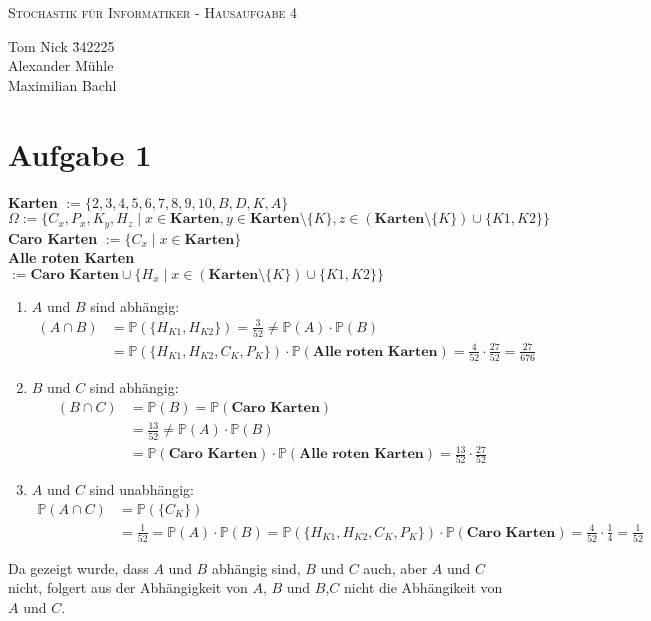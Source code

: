 \documentclass[10pt,a4paper,parskip=half]{scrartcl}
\newcommand{\PP}{\mathbb{P}}
\begin{document}
\begin{center}
\textsc{\Large{Stochastik für Informatiker - Hausaufgabe 4}} \\
\end{center}
\begin{tabbing}
Tom Nick \hspace{1.4cm}\= 342225\\
Alexander Mühle\\
Maximilian Bachl
\end{tabbing}
\section*{Aufgabe 1}
\textbf{Karten} $:= \{2,3,4,5,6,7,8,9,10,B,D,K,A\}$ \\
$\Omega := \{C_x, P_x, K_y, H_z \mid x \in \textbf{Karten}, y \in \textbf{Karten}\setminus\{K\}, z \in (\textbf{Karten}\setminus\{K\})\cup\{K1,K2\}\}$ \\
\textbf{Caro Karten} $:= \{C_x \mid x \in \textbf{Karten}\}$ \\
\textbf{Alle roten Karten} $:= \textbf{Caro Karten}   \cup \{H_x \mid x \in (\textbf{Karten}\setminus\{K\})\cup\{K1,K2\}\}$ \\
\begin{enumerate}
	\item $A$ und $B$ sind abhängig: \\
			 \begin{align*}(A \cap B) &= \PP(\{H_{K1}, H_{K2}\}) = \frac{3}{52} \neq \PP(A) \cdot \PP(B) \\
			 &=  \PP(\{H_{K1},H_{K2},C_{K},P_K\}) \cdot \PP(\textbf{Alle roten Karten}) = \frac{4}{52} \cdot \frac{27}{52} = \frac{27}{676} 			 
			 \end{align*}
	\item $B$ und $C$ sind abhängig: \\
			 \begin{align*}(B \cap C) &= \PP(B) = \PP(\textbf{Caro Karten} ) \\
			 &= \frac{13}{52} \neq \PP(A) \cdot \PP(B) \\
			 &=   \PP(\textbf{Caro Karten}) \cdot \PP(\textbf{Alle roten Karten}) = \frac{13}{52} \cdot \frac{27}{52} 
			 \end{align*}
	\item $A$ und $C$ sind unabhängig: \\
			 \begin{align*}\PP(A \cap C) &= \PP(\{C_K\} ) \\
			 &= \frac{1}{52} = \PP(A) \cdot \PP(B) = \PP(\{H_{K1},H_{K2},C_{K},P_K\}) \cdot \PP(\textbf{Caro Karten}) = \frac{4}{52} \cdot \frac14 = \frac{1}{52}
			 \end{align*}
\end{enumerate}
Da gezeigt wurde, dass $A$ und $B$ abhängig sind, $B$ und $C$ auch, aber $A$ und $C$ nicht, folgert aus der Abhängigkeit von $A$, $B$ und $B$,$C$ nicht die Abhängikeit von $A$ und $C$.
\end{document}
